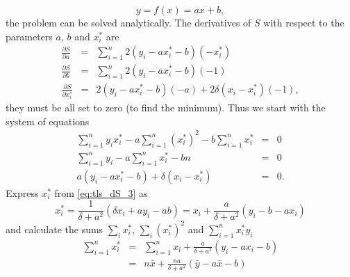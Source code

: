 \documentclass[a4paper,11pt,onepage]{article}
\newcommand{\ddp}[2]{\frac{\partial #1}{\partial #2}}
\begin{document}
\begin{equation}
 y = f(x) = ax +b,
\end{equation}
the problem can be solved analytically. The derivatives of $S$ with respect to the parameters $a$, $b$ and $x_i^*$ are
\begin{eqnarray*}
 \ddp{S}{a} &=& \sum_{i=1}^n 2(y_i - ax_i^* -b) (-x_i^*) \\
 \ddp{S}{b} &=& \sum_{i=1}^n 2 (y_i - ax_i^* -b) (-1) \\
 \ddp{S}{x_i^*} &=& 2 (y_i -ax_i^* -b) (-a) + 2 \delta(x_i - x_i^*) (-1),
\end{eqnarray*}
they must be all set to zero (to find the minimum). Thus we start with the system of equations
\begin{eqnarray}
 \sum_{i=1}^n y_i x_i^* - a \sum_{i=1}^n \left(x_i^*\right)^2 -b\sum_{i=1}^n x_i^* &=&  0\label{eq:tls_dS_1}\\
 \sum_{i=1}^n y_i - a \sum_{i=1}^n x_i^* -bn &=& 0 \label{eq:tls_dS_2} \\
 a(y_i -ax_i^* -b)  + \delta(x_i - x_i^*) &=& 0. \label{eq:tls_dS_3}
\end{eqnarray}
Express $x_i^*$ from \eqref{eq:tls_dS_3} as
\begin{equation}
 x_i^* = \frac1{\delta +a^2} \left( \delta x_i + a y_i - ab\right) = x_i + \frac{a}{\delta+a^2} \left( y_i -b - a x_i \right)
\end{equation}
and calculate the sums $\sum_i x_i^*$, $\sum_i \left(x_i^*\right)^2$ and $\sum_{i=1}^n x_i^* y_i$
\begin{eqnarray}
 \sum_{i=1}^n x_i^* &=& \sum_{i=1}^n  x_i + \frac{a}{\delta+a^2} \left( y_i - ax_i - b\right) \nonumber \\
 &=& n \bar x + \frac{na}{\delta+a^2} \left(  \bar y - a  \bar x - b\right) \label{eq:tls_sum_xstar}
\end{eqnarray}
\end{document}
